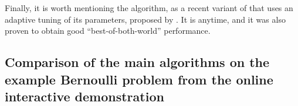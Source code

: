%



Finally, it is worth mentioning the \Exppp{} algorithm, as a recent variant of \ExpThree{} that uses an adaptive tuning of its parameters, proposed by \cite{Seldin17}.
It is anytime, and it was also proven to obtain good ``best-of-both-world'' performance.


\subsection{Comparison of the main algorithms on the example Bernoulli problem from the online interactive demonstration}
\label{sub:2:shortNumericalExperiments}

